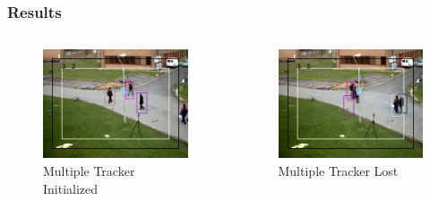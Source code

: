 \documentclass{beamer}
\begin{document}
\begin{frame}
	\frametitle{Results}
	\begin{columns}[T]
		\begin{column}{0.5\textwidth}
			\begin{figure}
				\begin{center}
					\includegraphics[width=\textwidth]{images/MultiTrackerInit01.png}
					\caption{Multiple Tracker Initialized}
				\end{center}
			\end{figure}
		\end{column}
		\begin{column}{0.5\textwidth}
			\begin{figure}
				\begin{center}
					\includegraphics[width=\textwidth]{images/MultiTrackerLost01.png}
					\caption{Multiple Tracker Lost}
				\end{center}
			\end{figure}
		\end{column}
	\end{columns}
\end{frame}
\end{document}
